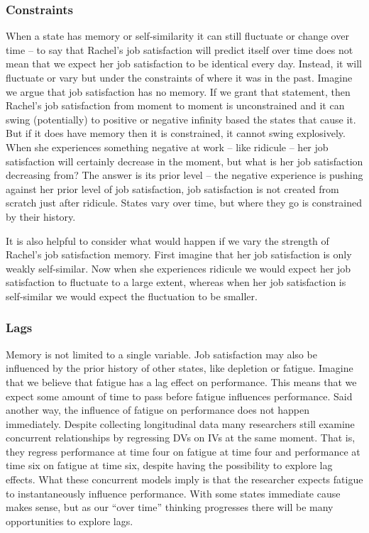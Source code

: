\documentclass[english,,man]{apa6}
\theoremstyle{definition}
\theoremstyle{definition}
\theoremstyle{definition}
\theoremstyle{remark}
\begin{document}
\hypertarget{constraints}{%
\subsubsection{Constraints}\label{constraints}}

When a state has memory or self-similarity it can still fluctuate or
change over time -- to say that Rachel's job satisfaction will predict
itself over time does not mean that we expect her job satisfaction to be
identical every day. Instead, it will fluctuate or vary but under the
constraints of where it was in the past. Imagine we argue that job
satisfaction has no memory. If we grant that statement, then Rachel's
job satisfaction from moment to moment is unconstrained and it can swing
(potentially) to positive or negative infinity based the states that
cause it. But if it does have memory then it is constrained, it cannot
swing explosively. When she experiences something negative at work --
like ridicule -- her job satisfaction will certainly decrease in the
moment, but what is her job satisfaction decreasing from? The answer is
its prior level -- the negative experience is pushing against her prior
level of job satisfaction, job satisfaction is not created from scratch
just after ridicule. States vary over time, but where they go is
constrained by their history.

It is also helpful to consider what would happen if we vary the strength
of Rachel's job satisfaction memory. First imagine that her job
satisfaction is only weakly self-similar. Now when she experiences
ridicule we would expect her job satisfaction to fluctuate to a large
extent, whereas when her job satisfaction is self-similar we would
expect the fluctuation to be smaller.

\hypertarget{lags}{%
\subsubsection{Lags}\label{lags}}

Memory is not limited to a single variable. Job satisfaction may also be
influenced by the prior history of other states, like depletion or
fatigue. Imagine that we believe that fatigue has a lag effect on
performance. This means that we expect some amount of time to pass
before fatigue influences performance. Said another way, the influence
of fatigue on performance does not happen immediately. Despite
collecting longitudinal data many researchers still examine concurrent
relationships by regressing DVs on IVs at the same moment. That is, they
regress performance at time four on fatigue at time four and performance
at time six on fatigue at time six, despite having the possibility to
explore lag effects. What these concurrent models imply is that the
researcher expects fatigue to instantaneously influence performance.
With some states immediate cause makes sense, but as our \enquote{over
time} thinking progresses there will be many opportunities to explore
lags.
\end{document}
